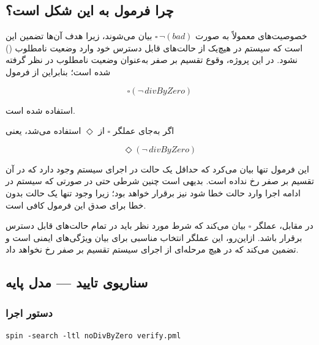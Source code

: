 \documentclass[12pt]{report}
\begin{document}
	\subsection{چرا فرمول به این شکل است؟}
	
	خصوصیت‌های  معمولاً به صورت
	$\square\,\neg(\mathit{bad})$
	بیان می‌شوند، زیرا هدف آن‌ها تضمین این است که سیستم در هیچ‌یک از حالت‌های قابل دسترس خود وارد وضعیت نامطلوب () نشود. در این پروژه، وقوع تقسیم بر صفر به‌عنوان وضعیت نامطلوب در نظر گرفته شده است؛ بنابراین از فرمول
	
	\[
	\square(\neg\,divByZero)
	\]
	
	استفاده شده است.
	
	اگر به‌جای عملگر $\square$ از $\Diamond$ استفاده می‌شد، یعنی
	
	\[
	\Diamond(\neg\,divByZero)
	\]
	
	این فرمول تنها بیان می‌کرد که حداقل یک حالت در اجرای سیستم وجود دارد که در آن تقسیم بر صفر رخ نداده است. بدیهی است چنین شرطی حتی در صورتی که سیستم در ادامه اجرا وارد حالت خطا شود نیز برقرار خواهد بود؛ زیرا وجود تنها یک حالت بدون خطا برای صدق این فرمول کافی است.
	
	در مقابل، عملگر $\square$ بیان می‌کند که شرط مورد نظر باید در تمام حالت‌های قابل دسترس برقرار باشد. ازاین‌رو، این عملگر انتخاب مناسبی برای بیان ویژگی‌های ایمنی است و تضمین می‌کند که در هیچ مرحله‌ای از اجرای سیستم تقسیم بر صفر رخ نخواهد داد.
	
	\subsection{سناریوی تایید --- مدل پایه}
	
	\subsubsection{دستور اجرا}
	\begin{latin}
		\begin{lstlisting}[style=codestyle]
			spin -search -ltl noDivByZero verify.pml
		\end{lstlisting}
	\end{latin}
	
\end{document}
